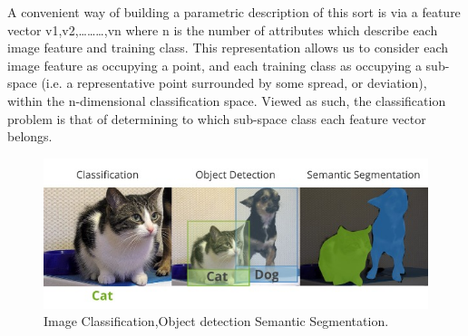 A convenient way of building a parametric description of this sort is via a feature vector v1,v2,………,vn where n is the number of attributes which describe each image feature and training class. This representation allows us to consider each image feature as occupying a point, and each training class as occupying a sub-space (i.e. a representative point surrounded by some spread, or deviation), within the n-dimensional classification space. Viewed as such, the classification problem is that of determining to which sub-space class each feature vector belongs.
\begin{figure}[H]
	\centering
	\includegraphics[width=0.7\linewidth]{images/classification_detection_segmentaion_comparisons.jpeg}
	\caption{Image Classification,Object detection Semantic Segmentation.}
\end{figure}
